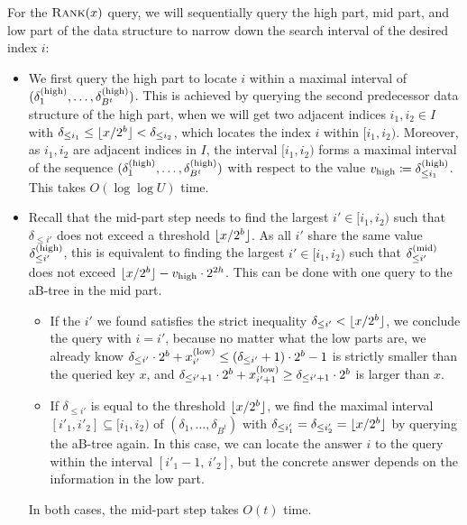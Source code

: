 \documentclass{article}
\theoremstyle{plain}
\theoremstyle{definition}  \newtheorem{definition}[theorem]{Definition}
\DeclarePairedDelimiter{\floor}{\lfloor}{\rfloor}
\DeclarePairedDelimiter{\bk}{(}{)}
\newcommand{\defeq}{\coloneqq}
\newcommand{\xlow}[1][i]{x_{#1}^{(\textup{low})}}
\newcommand{\deltamid}[1][i]{\delta_{#1}^{(\textup{mid})}}
\newcommand{\deltahigh}[1][i]{\delta_{#1}^{(\textup{high})}}
\newcommand{\rank}{\textup{\textsc{Rank}}\xspace}
\newcommand{\vhigh}{v_{\textup{high}}}
\begin{document}
For the $\rank(x)$ query, we will sequentially query the high part, mid part, and low part of the data structure to narrow down the search interval of the desired index $i$:
\begin{itemize}
\item We first query the high part to locate $i$ within a maximal interval of $\bk{\deltahigh[1], \ldots, \deltahigh[B^t]}$. This is achieved by querying the second predecessor data structure of the high part, when we will get two adjacent indices $i_1, i_2 \in I$ with $\delta_{\le i_1} \le \floor{x/2^b} < \delta_{\le i_2}$, which locates the index $i$ within $[i_1, i_2)$. Moreover, as $i_1, i_2$ are adjacent indices in $I$, the interval $[i_1, i_2)$ forms a maximal interval of the sequence $\bk{\deltahigh[1], \ldots, \deltahigh[B^t]}$ with respect to the value $\vhigh \defeq \deltahigh[\le i_1]$. This takes $O(\log \log U)$ time.
\item Recall that the mid-part step needs to find the largest $i' \in [i_1, i_2)$ such that $\delta_{\le {i'}}$ does not exceed a threshold $\floor{x / 2^b}$. As all ${i'}$ share the same value $\deltahigh[\le {i'}]$, this is equivalent to finding the largest ${i'} \in [i_1, i_2)$ such that $\deltamid[\le {i'}]$ does not exceed $\floor{x / 2^b} - \vhigh \cdot 2^{2h}$. This can be done with one query to the aB-tree in the mid part.
  \begin{itemize}
  \item If the ${i'}$ we found satisfies the strict inequality $\delta_{\le {i'}} < \floor{x / 2^b}$, we conclude the query with $i = {i'}$, because no matter what the low parts are, we already know $\delta_{\le {i'}} \cdot 2^b + \xlow[i'] \le (\delta_{\le i'} + 1) \cdot 2^b - 1$ is strictly smaller than the queried key $x$, and $\delta_{\le {i' + 1}} \cdot 2^b + \xlow[i' + 1] \ge \delta_{\le {i' + 1}} \cdot 2^b$ is larger than $x$.
  \item If $\delta_{\le i'}$ is equal to the threshold $\floor{x / 2^b}$, we find the maximal interval $[i'_1, i'_2] \subseteq [i_1, i_2)$ of $(\delta_1, \ldots, \delta_{B^t})$ with $\delta_{\le i'_1} = \delta_{\le i'_2} = \floor{x / 2^b}$ by querying the aB-tree again. In this case, we can locate the answer $i$ to the query within the interval $[i'_1 - 1, \, i'_2]$, but the concrete answer depends on the information in the low part.
  \end{itemize}
  In both cases, the mid-part step takes $O(t)$ time.


\end{itemize}
\end{document}
